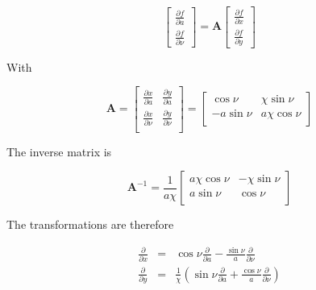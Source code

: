 \documentclass[apj]{emulateapj}
\newcommand{\pderiv}[2]{\frac{\partial #1}{\partial #2}}
\newcommand{\pderivn}[3]{\frac{\partial^{#3} #1}{\partial #2^{#3}}}
\newcommand{\vt}[1]{\mathbf{#1}}       %
\newcommand{\beq}{\begin{equation}}
\newcommand{\eeq}{\end{equation}}
\newcommand{\beqn}{\begin{eqnarray}}
\newcommand{\eeqn}{\end{eqnarray}}
\begin{document}
\beq
\left[\begin{array}{c}
    \pderiv{f}{a}  \\
    \pderiv{f}{\nu}
  \end{array}\right] = \vt{A} 
  \left[\begin{array}{c}
      \pderiv{f}{x}  \\
      \pderiv{f}{y}
    \end{array}\right] 
\eeq

With 

\beq
\vt{A} = \left[\begin{array}{cc}
\pderiv{x}{a}  & \pderiv{y}{a}  \\
\pderiv{x}{\nu}  & \pderiv{y}{\nu} \\
\end{array}\right] = \left[\begin{array}{cc}
\cos\nu  & \chi\sin\nu  \\
-a\sin\nu  & a\chi\cos\nu \\
\end{array}\right] 
\eeq

The inverse matrix is 

\beq
\vt{A}^{-1} = \frac{1}{a\chi} \left[\begin{array}{cc}
a\chi\cos\nu  & -\chi\sin\nu  \\
a\sin\nu  & \cos\nu \\
\end{array}\right]  
\eeq

The transformations are therefore

\beqn
\pderiv{}{x} &=& \cos\nu \pderiv{}{a} - \frac{\sin\nu}{a} \pderiv{}{\nu} \\
\pderiv{}{y} &=& \frac{1}{\chi}\left(\sin\nu \pderiv{}{a} + \frac{\cos\nu}{a} \pderiv{}{\nu} \right)
\eeqn



\end{document}
